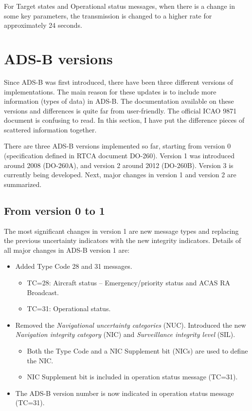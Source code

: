 For Target states and Operational status messages, when there is a change in some key parameters, the transmission is changed to a higher rate for approximately 24 seconds.




\section{ADS-B versions}

Since ADS-B was first introduced, there have been three different versions of implementations. The main reason for these updates is to include more information (types of data) in ADS-B. The documentation available on these versions and differences is quite far from user-friendly. The official ICAO 9871 document \cite{icao9871v1} is confusing to read. In this section, I have put the difference pieces of scattered information together.

There are three ADS-B versions implemented so far, starting from version 0 (specification defined in RTCA document DO-260). Version 1 was introduced around 2008 (DO-260A), and version 2 around 2012 (DO-260B). Version 3 is currently being developed. Next, major changes in version 1 and version 2 are summarized.

\subsection{From version 0 to 1}

The most significant changes in version 1 are new message types and replacing the previous uncertainty indicators with the new integrity indicators. Details of all major changes in ADS-B version 1 are:

\begin{itemize}
  \item Added Type Code 28 and 31 messages.

  \begin{itemize}
    \item TC=28: Aircraft status -- Emergency/priority status and ACAS RA Broadcast.
    \item TC=31: Operational status.
  \end{itemize}

  \item Removed the \emph{Navigational uncertainty categories} (NUC). Introduced the new \emph{Navigation integrity category} (NIC) and \emph{Surveillance integrity level} (SIL).

  \begin{itemize}
    \item Both the Type Code and a NIC Supplement bit (NICs) are used to define the NIC.
    \item NIC Supplement bit is included in operation status message (TC=31).
  \end{itemize}

  \item The ADS-B version number is now indicated in operation status message (TC=31).
\end{itemize}

